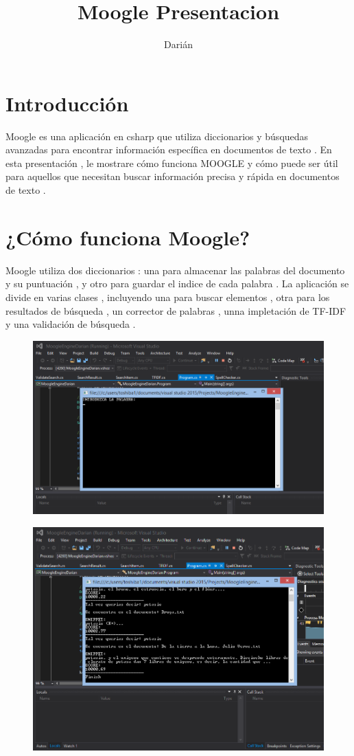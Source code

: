 \documentclass[12pt,a4paper]{article}
\author{Darián}
\title{Moogle Presentacion}
\begin{document}
\section{Introducción}
Moogle es una aplicación en csharp que utiliza diccionarios y búsquedas avanzadas para encontrar información específica en documentos de texto . En esta presentación , le mostrare cómo funciona MOOGLE y cómo puede ser útil para aquellos que necesitan buscar información precisa y rápida en documentos de texto .
\section{¿Cómo funciona Moogle?}
Moogle utiliza dos diccionarios : una para almacenar las palabras del documento y su puntuación , y otro para guardar el indice de cada palabra . La aplicación se divide en varias clases , incluyendo una para buscar elementos , otra para los resultados de búsqueda , un corrector de palabras , unna impletación de TF-IDF y una validación de búsqueda .   
\begin{figure}[H]
\centering
\includegraphics[scale=0.5]{Busqueda1}
\end{figure}
\begin{figure}[H]
\centering
\includegraphics[scale=0.5]{Busqueda2}
\end{figure}
\end{document}
